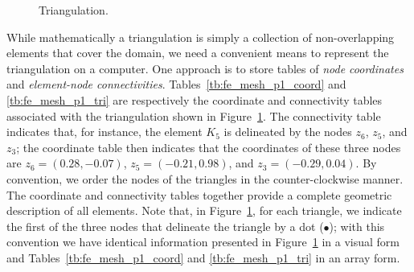 \begin{figure}
  \centering
  \caption{Triangulation.}
  \label{fig:fe_mesh_p1}
\end{figure}

While mathematically a triangulation is simply a collection of non-overlapping elements that cover the domain, we need a convenient means to represent the triangulation on a computer.  One approach is to store tables of \emph{node coordinates} and \emph{element-node connectivities}.  Tables~\ref{tb:fe_mesh_p1_coord} and \ref{tb:fe_mesh_p1_tri} are respectively the coordinate and connectivity tables associated with the triangulation shown in Figure~\ref{fig:fe_mesh_p1}. The connectivity table indicates that, for instance, the element $K_5$ is delineated by the nodes $z_6$, $z_5$, and $z_3$; the coordinate table then indicates that the coordinates of these three nodes are $z_6 = (0.28,-0.07)$, $z_5 = (-0.21,0.98)$, and $z_3 = (-0.29,0.04)$. By convention, we order the nodes of the triangles in the counter-clockwise manner. The coordinate and connectivity tables together provide a complete geometric description of all elements.  Note that, in Figure~\ref{fig:fe_mesh_p1}, for each triangle, we indicate the first of the three nodes that delineate the triangle by a dot ($\bullet$); with this convention we have identical information presented in Figure~\ref{fig:fe_mesh_p1} in a visual form and Tables~\ref{tb:fe_mesh_p1_coord} and \ref{tb:fe_mesh_p1_tri} in an array form.

